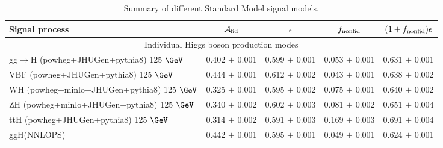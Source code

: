 \documentclass{article}
\begin{document}
\begin{table}[!h!tb]
\begin{center}
\small
\caption{
Summary of different Standard Model signal models.
\label{tab:summarySM}
}
\begin{tabular}{|l|c|c|c|c|} \hline \hline 
\textbf{Signal process} & $\mathcal{A}_{\rm fid}$ & $\epsilon$ & $f_{\rm nonfid}$  & $(1+f_{\rm nonfid})\epsilon$ \\ \hline \hline 
\multicolumn{5}{|c|}{Individual Higgs boson production modes} \\ \hline 
gg$\rightarrow$H ({\sc powheg+JHUGen+pythia8}) 125 $\GeV$ & 0.402 $\pm$ 0.001 & 0.599 $\pm$ 0.001 & 0.053 $\pm$ 0.001 & 0.631 $\pm$ 0.001 \\ 
 VBF ({\sc powheg+JHUGen+pythia8}) 125 $\GeV$ & 0.444 $\pm$ 0.001 & 0.612 $\pm$ 0.002 & 0.043 $\pm$ 0.001 & 0.638 $\pm$ 0.002 \\ 
 WH ({\sc powheg+minlo+JHUGen+pythia8}) 125 $\GeV$ & 0.325 $\pm$ 0.001 & 0.595 $\pm$ 0.002 & 0.075 $\pm$ 0.001 & 0.640 $\pm$ 0.002 \\ 
 ZH ({\sc powheg+minlo+JHUGen+pythia8}) 125 $\GeV$ & 0.340 $\pm$ 0.002 & 0.602 $\pm$ 0.003 & 0.081 $\pm$ 0.002 & 0.651 $\pm$ 0.004 \\ 
 ttH ({\sc powheg+JHUGen+pythia8}) 125 $\GeV$ & 0.314 $\pm$ 0.002 & 0.591 $\pm$ 0.003 & 0.169 $\pm$ 0.003 & 0.691 $\pm$ 0.004 \\ 
 ggH(NNLOPS) & 0.442 $\pm$ 0.001 & 0.595 $\pm$ 0.001 & 0.049 $\pm$ 0.001 & 0.624 $\pm$ 0.001 \\ 
 
\hline \hline
\end{tabular}
\normalsize
\end{center}
\end{table}
\end{document}
